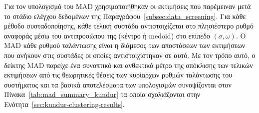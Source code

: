 \begin{table}[!htbp]
\centering
\caption{Ρυθμοί αναφοράς του συστήματος IEEE 39-Bus.}
\label{tab:ieee39_reference_modes}
\end{table}
\fi

\ifkundursystemanalysis
Για τον υπολογισμό του MAD χρησιμοποιήθηκαν οι εκτιμήσεις που παρέμειναν μετά το
στάδιο ελέγχου δεδομένων της Παραγράφου~\ref{subsec:data_screening}. Για κάθε μέθοδο συσταδοποίησης, κάθε τελική συστάδα αντιστοιχίζεται στο πλησιέστερο ρυθμό αναφοράς μέσω του
αντιπροσώπου της (κέντρο ή medoid) στο επίπεδο $(\sigma,\omega)$. Ο MAD κάθε ρυθμού ταλάντωσης είναι η διάμεσος των αποστάσεων
των εκτιμήσεων που ανήκουν στις συστάδες οι οποίες αντιστοιχίστηκαν σε αυτό. Με τον τρόπο
αυτό, ο δείκτης MAD παρείχε ένα συνοπτικό και ανθεκτικό μέτρο της απόκλισης των τελικών
εκτιμήσεων από τις θεωρητικές θέσεις των κυρίαρχων ρυθμών ταλάντωσης του συστήματος και τα βασικά αποτελέσματα των υπολογισμών συνοψίζονται στον Πίνακα~\ref{tab:mad_summary_kundur} τα οποία σχολιάζονται στην Ενότητα~\ref{sec:kundur-clustering-results}.




